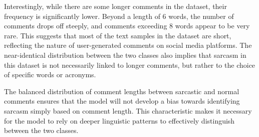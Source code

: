 Interestingly, while there are some longer comments in the dataset, their frequency is significantly lower. Beyond a length of 6 words, the number of comments drops off steeply, and 
comments exceeding 8 words appear to be very rare. This suggests that most of the text samples in the dataset are short, reflecting the nature of user-generated comments on social media 
platforms. The near-identical distribution between the two classes also implies that sarcasm in this dataset is not necessarily linked to longer comments, but rather to the choice of 
specific words or acronyms.

The balanced distribution of comment lengths between sarcastic and normal comments ensures that the model will not develop a bias towards identifying sarcasm simply based on comment 
length. This characteristic makes it necessary for the model to rely on deeper linguistic patterns to effectively distinguish between the two classes.
